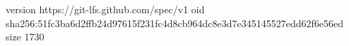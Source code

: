 version https://git-lfs.github.com/spec/v1
oid sha256:51fc3ba6d2ffb24d97615f231fc4d8cb964dc8e3d7e345145527edd62f6e56ed
size 1730

